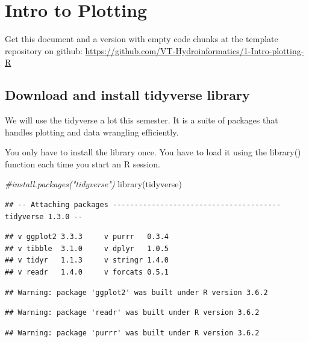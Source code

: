 \documentclass[
]{book}
\newenvironment{Shaded}{\begin{snugshade}}{\end{snugshade}}
\newcommand{\CommentTok}[1]{\textcolor[rgb]{0.56,0.35,0.01}{\textit{#1}}}
\newcommand{\FunctionTok}[1]{\textcolor[rgb]{0.00,0.00,0.00}{#1}}
\newcommand{\NormalTok}[1]{#1}
\begin{document}
\hypertarget{Plotting}{%
\chapter{Intro to Plotting}\label{Plotting}}

Get this document and a version with empty code chunks at the template repository on github: \url{https://github.com/VT-Hydroinformatics/1-Intro-plotting-R}

\hypertarget{download-and-install-tidyverse-library}{%
\section{Download and install tidyverse library}\label{download-and-install-tidyverse-library}}

We will use the tidyverse a lot this semester. It is a suite of packages that handles plotting and data wrangling efficiently.

You only have to install the library once. You have to load it using the library() function each time you start an R session.

\begin{Shaded}
\begin{Highlighting}[]
\CommentTok{\#install.packages("tidyverse")}
\FunctionTok{library}\NormalTok{(tidyverse)}
\end{Highlighting}
\end{Shaded}

\begin{verbatim}
## -- Attaching packages --------------------------------------- tidyverse 1.3.0 --
\end{verbatim}

\begin{verbatim}
## v ggplot2 3.3.3     v purrr   0.3.4
## v tibble  3.1.0     v dplyr   1.0.5
## v tidyr   1.1.3     v stringr 1.4.0
## v readr   1.4.0     v forcats 0.5.1
\end{verbatim}

\begin{verbatim}
## Warning: package 'ggplot2' was built under R version 3.6.2
\end{verbatim}

\begin{verbatim}
## Warning: package 'readr' was built under R version 3.6.2
\end{verbatim}

\begin{verbatim}
## Warning: package 'purrr' was built under R version 3.6.2
\end{verbatim}
\end{document}
